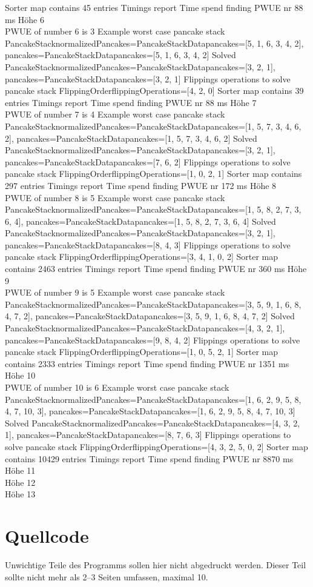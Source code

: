 Sorter map contains 45 entries
Timings report
Time spend finding PWUE nr 88 ms
Höhe 6 \\
PWUE of number 6 is 3
Example worst case pancake stack PancakeStack{normalizedPancakes=PancakeStackData{pancakes=[5, 1, 6, 3, 4, 2]}, pancakes=PancakeStackData{pancakes=[5, 1, 6, 3, 4, 2]}}
Solved PancakeStack{normalizedPancakes=PancakeStackData{pancakes=[3, 2, 1]}, pancakes=PancakeStackData{pancakes=[3, 2, 1]}}
Flippings operations to solve pancake stack FlippingOrder{flippingOperations=[4, 2, 0]}
Sorter map contains 39 entries
Timings report
Time spend finding PWUE nr 88 ms
Höhe 7 \\
PWUE of number 7 is 4
Example worst case pancake stack PancakeStack{normalizedPancakes=PancakeStackData{pancakes=[1, 5, 7, 3, 4, 6, 2]}, pancakes=PancakeStackData{pancakes=[1, 5, 7, 3, 4, 6, 2]}}
Solved PancakeStack{normalizedPancakes=PancakeStackData{pancakes=[3, 2, 1]}, pancakes=PancakeStackData{pancakes=[7, 6, 2]}}
Flippings operations to solve pancake stack FlippingOrder{flippingOperations=[1, 0, 2, 1]}
Sorter map contains 297 entries
Timings report
Time spend finding PWUE nr 172 ms
Höhe 8 \\
PWUE of number 8 is 5
Example worst case pancake stack PancakeStack{normalizedPancakes=PancakeStackData{pancakes=[1, 5, 8, 2, 7, 3, 6, 4]}, pancakes=PancakeStackData{pancakes=[1, 5, 8, 2, 7, 3, 6, 4]}}
Solved PancakeStack{normalizedPancakes=PancakeStackData{pancakes=[3, 2, 1]}, pancakes=PancakeStackData{pancakes=[8, 4, 3]}}
Flippings operations to solve pancake stack FlippingOrder{flippingOperations=[3, 4, 1, 0, 2]}
Sorter map contains 2463 entries
Timings report
Time spend finding PWUE nr 360 ms
Höhe 9 \\
PWUE of number 9 is 5
Example worst case pancake stack PancakeStack{normalizedPancakes=PancakeStackData{pancakes=[3, 5, 9, 1, 6, 8, 4, 7, 2]}, pancakes=PancakeStackData{pancakes=[3, 5, 9, 1, 6, 8, 4, 7, 2]}}
Solved PancakeStack{normalizedPancakes=PancakeStackData{pancakes=[4, 3, 2, 1]}, pancakes=PancakeStackData{pancakes=[9, 8, 4, 2]}}
Flippings operations to solve pancake stack FlippingOrder{flippingOperations=[1, 0, 5, 2, 1]}
Sorter map contains 2333 entries
Timings report
Time spend finding PWUE nr 1351 ms
Höhe 10 \\
PWUE of number 10 is 6
Example worst case pancake stack PancakeStack{normalizedPancakes=PancakeStackData{pancakes=[1, 6, 2, 9, 5, 8, 4, 7, 10, 3]}, pancakes=PancakeStackData{pancakes=[1, 6, 2, 9, 5, 8, 4, 7, 10, 3]}}
Solved PancakeStack{normalizedPancakes=PancakeStackData{pancakes=[4, 3, 2, 1]}, pancakes=PancakeStackData{pancakes=[8, 7, 6, 3]}}
Flippings operations to solve pancake stack FlippingOrder{flippingOperations=[4, 3, 2, 5, 0, 2]}
Sorter map contains 10429 entries
Timings report
Time spend finding PWUE nr 8870 ms
Höhe 11 \\

Höhe 12 \\
Höhe 13 \\

\section{Quellcode}\label{sec:quellcode}
Unwichtige Teile des Programms sollen hier nicht abgedruckt werden.
Dieser Teil sollte nicht mehr als 2–3 Seiten umfassen, maximal 10.

